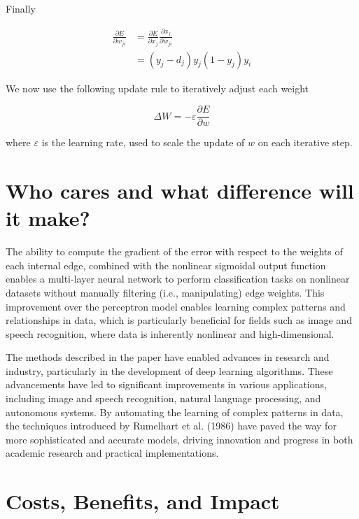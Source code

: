 \documentclass[10pt]{article}
\begin{document}
Finally

\begin{align}
    \frac{\partial E}{\partial w_{ji}} & = \frac{\partial E}{\partial x_{j}} \frac{\partial x_{j}}{\partial w_{ji}} \\
                                       & = (y_j - d_j) y_j(1-y_j) y_{i}
\end{align}

We now use the following update rule to iteratively adjust each weight

$$ \Delta W = - \varepsilon \frac{\partial E}{\partial w} $$

where $\varepsilon$ is the learning rate, used to scale the update of $w$ on each iterative step.

\section*{Who cares and what difference will it make?}

The ability to compute the gradient of the error with respect to the weights of each internal edge, combined with the nonlinear sigmoidal output function enables a multi-layer neural network to perform classification tasks on nonlinear datasets without manually filtering (i.e., manipulating) edge weights. This improvement over the perceptron model enables learning complex patterns and relationships in data, which is particularly beneficial for fields such as image and speech recognition, where data is inherently nonlinear and high-dimensional.

The methods described in the paper have enabled advances in research and industry, particularly in the development of deep learning algorithms. These advancements have led to significant improvements in various applications, including image and speech recognition, natural language processing, and autonomous systems. By automating the learning of complex patterns in data, the techniques introduced by Rumelhart et al. (1986) have paved the way for more sophisticated and accurate models, driving innovation and progress in both academic research and practical implementations.

\section*{Costs, Benefits, and Impact}
\end{document}

